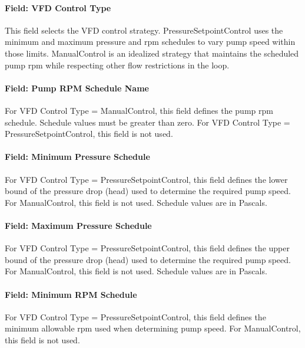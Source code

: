\paragraph{Field: VFD Control Type}\label{field-vfd-control-type}

This field selects the VFD control strategy. PressureSetpointControl uses the minimum and maximum pressure and rpm schedules to vary pump speed within those limits. ManualControl is an idealized strategy that maintains the scheduled pump rpm while respecting other flow restrictions in the loop.

\paragraph{Field: Pump RPM Schedule Name}\label{field-pump-rpm-schedule-name}

For VFD Control Type = ManualControl, this field defines the pump rpm schedule. Schedule values must be greater than zero. For VFD Control Type = PressureSetpointControl, this field is not used.

\paragraph{Field: Minimum Pressure Schedule}\label{field-minimum-pressure-schedule}

For VFD Control Type = PressureSetpointControl, this field defines the lower bound of the pressure drop (head) used to determine the required pump speed. For ManualControl, this field is not used. Schedule values are in Pascals.

\paragraph{Field: Maximum Pressure Schedule}\label{field-maximum-pressure-schedule}

For VFD Control Type = PressureSetpointControl, this field defines the upper bound of the pressure drop (head) used to determine the required pump speed. For ManualControl, this field is not used. Schedule values are in Pascals.

\paragraph{Field: Minimum RPM Schedule}\label{field-minimum-rpm-schedule}

For VFD Control Type = PressureSetpointControl, this field defines the minimum allowable rpm used when determining pump speed. For ManualControl, this field is not used.


